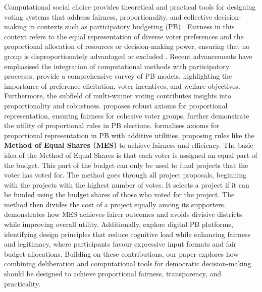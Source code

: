 Computational social choice provides theoretical and practical tools for designing voting systems that address fairness, proportionality, and collective decision-making in contexts such as participatory budgeting (PB) \cite{brandt2016}. Fairness in this context refers to the equal representation of diverse voter preferences and the proportional allocation of resources or decision-making power, ensuring that no group is disproportionately advantaged or excluded \cite{fain2016}. Recent advancements have emphasised the integration of computational methods with participatory processes. \citet{aziz2020} provide a comprehensive survey of PB models, highlighting the importance of preference elicitation, voter incentives, and welfare objectives. Furthermore, the subfield of multi-winner voting contributes insights into proportionality and robustness. \citet{brill2023} proposes robust axioms for proportional representation, ensuring fairness for cohesive voter groups. \citet{faliszewski2023} further demonstrate the utility of proportional rules in PB elections. \citet{peters2021} formalises axioms for proportional representation in PB with additive utilities, proposing rules like the \textbf{Method of Equal Shares (MES)} to achieve fairness and efficiency. The basic idea of the Method of Equal Shares is that each voter is assigned an equal part of the budget. This part of the budget can only be used to fund projects that the voter has voted for. The method goes through all project proposals, beginning with the projects with the highest number of votes. It selects a project if it can be funded using the budget shares of those who voted for the project. The method then divides the cost of a project equally among its supporters. \citet{faliszewski2023} demonstrates how MES achieves fairer outcomes and avoids divisive districts while improving overall utility. Additionally, \citet{yang2024} explore digital PB platforms, identifying design principles that reduce cognitive load while enhancing fairness and legitimacy, where participants favour expressive input formats and fair budget allocations. Building on these contributions, our paper explores how combining deliberation and computational tools for democratic decision-making should be designed to achieve proportional fairness, transparency, and practicality.